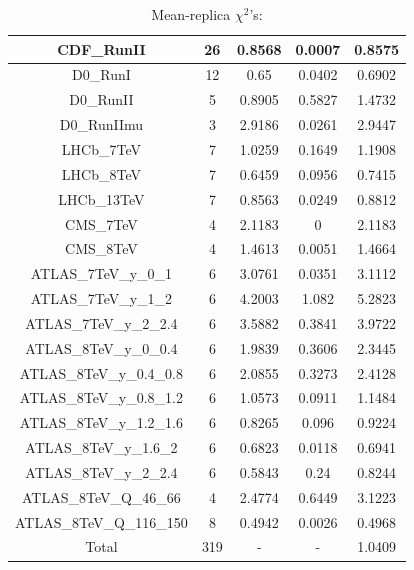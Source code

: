 \documentclass[
]{article}
\begin{document}
\begin{table}[h]
\begin{tabular}{|c|c|c|c|c|}
CDF\_RunII & 26 & 0.8568 & 0.0007 & 0.8575 \\ \hline
D0\_RunI & 12 & 0.65 & 0.0402 & 0.6902 \\ \hline
D0\_RunII & 5 & 0.8905 & 0.5827 & 1.4732 \\ \hline
D0\_RunIImu & 3 & 2.9186 & 0.0261 & 2.9447 \\ \hline
LHCb\_7TeV & 7 & 1.0259 & 0.1649 & 1.1908 \\ \hline
LHCb\_8TeV & 7 & 0.6459 & 0.0956 & 0.7415 \\ \hline
LHCb\_13TeV & 7 & 0.8563 & 0.0249 & 0.8812 \\ \hline
CMS\_7TeV & 4 & 2.1183 & 0 & 2.1183 \\ \hline
CMS\_8TeV & 4 & 1.4613 & 0.0051 & 1.4664 \\ \hline
ATLAS\_7TeV\_y\_0\_1 & 6 & 3.0761 & 0.0351 & 3.1112 \\ \hline
ATLAS\_7TeV\_y\_1\_2 & 6 & 4.2003 & 1.082 & 5.2823 \\ \hline
ATLAS\_7TeV\_y\_2\_2.4 & 6 & 3.5882 & 0.3841 & 3.9722 \\ \hline
ATLAS\_8TeV\_y\_0\_0.4 & 6 & 1.9839 & 0.3606 & 2.3445 \\ \hline
ATLAS\_8TeV\_y\_0.4\_0.8 & 6 & 2.0855 & 0.3273 & 2.4128 \\ \hline
ATLAS\_8TeV\_y\_0.8\_1.2 & 6 & 1.0573 & 0.0911 & 1.1484 \\ \hline
ATLAS\_8TeV\_y\_1.2\_1.6 & 6 & 0.8265 & 0.096 & 0.9224 \\ \hline
ATLAS\_8TeV\_y\_1.6\_2 & 6 & 0.6823 & 0.0118 & 0.6941 \\ \hline
ATLAS\_8TeV\_y\_2\_2.4 & 6 & 0.5843 & 0.24 & 0.8244 \\ \hline
ATLAS\_8TeV\_Q\_46\_66 & 4 & 2.4774 & 0.6449 & 3.1223 \\ \hline
ATLAS\_8TeV\_Q\_116\_150 & 8 & 0.4942 & 0.0026 & 0.4968 \\ \hline
Total & 319 & - & - & 1.0409 \\ \hline

\end{tabular}

\caption{Mean-replica \(\chi^2\)'s:}

\end{table}
\end{document}
